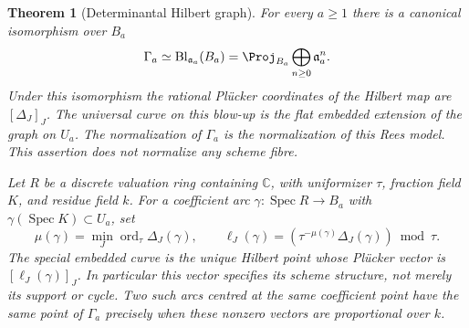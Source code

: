 \documentclass[11pt,reqno]{amsart}
\numberwithin{equation}{section}
\newtheorem{theorem}{Theorem}[section]
\theoremstyle{definition}\newtheorem{definition}[theorem]{Definition}
\theoremstyle{remark}\newtheorem{remark}[theorem]{Remark}
\newcommand{\C}{\mathbb C}\newcommand{\Q}{\mathbb Q}
\DeclareMathOperator{\Spec}{Spec}\DeclareMathOperator{\PGL}{PGL}
\begin{document}
\begin{theorem}[Determinantal Hilbert graph]\label{thm:determinantal-v167}
For every $a\geq1$ there is a canonical isomorphism over $B_a$
\begin{equation}\label{eq:rees-hilbert-v167}
 \Gamma_a\simeq\operatorname{Bl}_{\mathfrak a_a}(B_a)
       =\Proj_{B_a}\bigoplus_{n\geq0}\mathfrak a_a^n.
\end{equation}
Under this isomorphism the rational Pl\"ucker coordinates of the
Hilbert map are $[\Delta_J]_J$. The universal curve on this blow-up
is the flat embedded extension of the graph on $U_a$.
The normalization of $\Gamma_a$ is the normalization of this Rees
model. This assertion does not normalize any scheme fibre.

Let $R$ be a discrete valuation ring containing $\C$, with
uniformizer $\tau$, fraction field $K$, and residue field $k$.
For a coefficient arc $\gamma:\Spec R\to B_a$ with
$\gamma(\Spec K)\subset U_a$, set
\begin{equation}\label{eq:determinantal-order-v167}
 \mu(\gamma)=\min_J\operatorname{ord}_{\tau}\Delta_J(\gamma),
 \qquad
 \ell_J(\gamma)=\left(\tau^{-\mu(\gamma)}
                                \Delta_J(\gamma)\right)\bmod\tau.
\end{equation}
The special embedded curve is the unique Hilbert point whose
Pl\"ucker vector is $[\ell_J(\gamma)]_J$. In particular this vector
specifies its scheme structure, not merely its support or cycle.
Two such arcs centred at the same coefficient point have the same
point of $\Gamma_a$ precisely when these nonzero vectors are
proportional over $k$.
\end{theorem}
\end{document}
